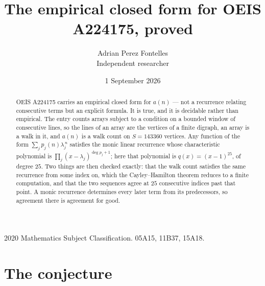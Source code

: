 \documentclass[11pt,a4paper]{article}
\title{The empirical closed form for OEIS A224175, proved}
\author{Adrian Perez Fontelles\\ \small Independent researcher}
\date{1 September 2026}
\theoremstyle{plain}
\theoremstyle{definition}
\begin{document}
\maketitle

\begin{abstract}
OEIS A224175 carries an empirical closed form for $a(n)$ --- not a recurrence relating
consecutive terms but an explicit formula. It is true, and it is decidable rather than
empirical. The entry counts arrays subject to a condition on a bounded window of consecutive lines, so the lines of an array are the
vertices of a finite digraph, an array is a walk in it, and $a(n)$ is a walk count on
$S=143360$ vertices. Any function of the form $\sum_j p_j(n)\lambda_j^{\,n}$ satisfies the
monic linear recurrence whose characteristic polynomial is
$\prod_j(x-\lambda_j)^{\deg p_j+1}$; here that polynomial is $q(x)=(x-1)^{25}$, of degree
$25$. Two things are then checked exactly: that the walk count satisfies the same
recurrence from some index on, which the Cayley--Hamilton theorem reduces to a finite
computation, and that the two sequences agree at $25$ consecutive indices past that
point. A monic recurrence determines every later term from its predecessors, so agreement
there is agreement for good.
\end{abstract}

\noindent\small 2020 Mathematics Subject Classification. 05A15, 11B37, 15A18.\normalsize

\section{The conjecture}
\end{document}
